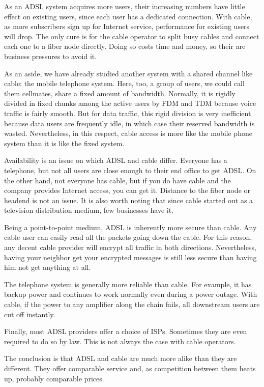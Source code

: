 As an ADSL system acquires more users, their increasing numbers have
little effect on existing users, since each user has a dedicated
connection. With cable, as more subscribers sign up for Internet
service, performance for existing users will drop. The only cure is for
the cable operator to split busy cables and connect each one to a fiber
node directly. Doing so costs time and money, so their are business
pressures to avoid it.

As an aside, we have already studied another system with a shared
channel like cable: the mobile telephone system. Here, too, a group of
users, we could call them cellmates, share a fixed amount of bandwidth.
Normally, it is rigidly divided in fixed chunks among the active users
by FDM and TDM because voice traffic is fairly smooth. But for data
traffic, this rigid division is very inefficient because data users are
frequently idle, in which case their reserved bandwidth is wasted.
Nevertheless, in this respect, cable access is more like the mobile
phone system than it is like the fixed system.

Availability is an issue on which ADSL and cable differ. Everyone has a
telephone, but not all users are close enough to their end office to get
ADSL. On the other hand, not everyone has cable, but if you do have
cable and the company provides Internet access, you can get it. Distance
to the fiber node or headend is not an issue. It is also worth noting
that since cable started out as a television distribution medium, few
businesses have it.

Being a point-to-point medium, ADSL is inherently more secure than
cable. Any cable user can easily read all the packets going down the
cable. For this reason, any decent cable provider will encrypt all
traffic in both directions. Nevertheless, having your neighbor get your
encrypted messages is still less secure than having him not get anything
at all.

The telephone system is generally more reliable than cable. For example,
it has backup power and continues to work normally even during a power
outage. With cable, if the power to any amplifier along the chain fails,
all downstream users are cut off instantly.

Finally, most ADSL providers offer a choice of ISPs. Sometimes they are
even required to do so by law. This is not always the case with cable
operators.

The conclusion is that ADSL and cable are much more alike than they are
different. They offer comparable service and, as competition between
them heats up, probably comparable prices.

